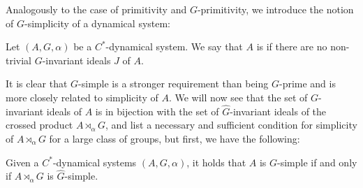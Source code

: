 Analogously to the case of primitivity and $G$-primitivity, we introduce the notion of $G$-simplicity of a dynamical system:
\begin{definition}
	Let $(A,G,\alpha)$ be a $C^*$-dynamical system. We say that $A$ is  if there are no non-trivial $G$-invariant ideals $J$ of $A$.
\end{definition}
It is clear that $G$-simple is a stronger requirement than being $G$-prime and is more closely related to simplicity of $A$. We will now see that the set of $G$-invariant ideals of $A$ is in bijection with the set of $\hat G$-invariant ideals of the crossed product $A \rtimes_\alpha G$, and list a necessary and sufficient condition for simplicity of $A \rtimes_\alpha G$ for a large class of groups, but first, we have the following:
\begin{proposition}
	Given a $C^*$-dynamical systems $(A,G,\alpha)$, it holds that $A$ is $G$-simple if and only if $A \rtimes_\alpha G$ is $\hat G$-simple.
	\label{olpe1.6.1}
\end{proposition}
